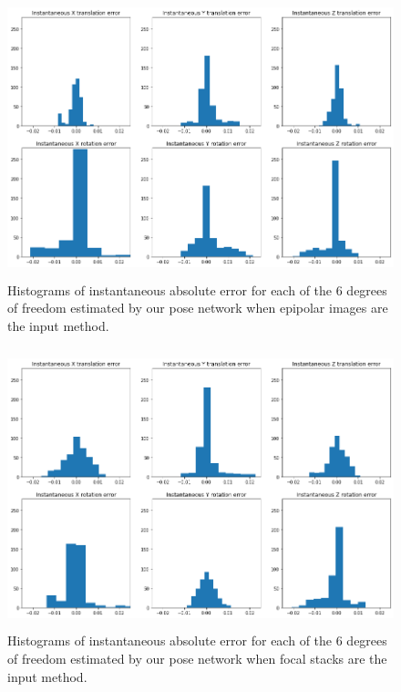 \begin{figure}[H]
    \centering
    \includegraphics[width=\textwidth, height=3.2in]{images/result-examples/pose/errors/multiwarp-epi.png}
    \caption{Histograms of instantaneous absolute error for each of the 6 degrees of freedom estimated by our pose network when epipolar images are the input method.}
\end{figure}
\begin{figure}[H]
    \centering
    \includegraphics[width=\textwidth, height=3.2in]{images/result-examples/pose/errors/multiwarp-focalstack-17-5.png}
    \caption{Histograms of instantaneous absolute error for each of the 6 degrees of freedom estimated by our pose network when focal stacks are the input method.}
\end{figure}
